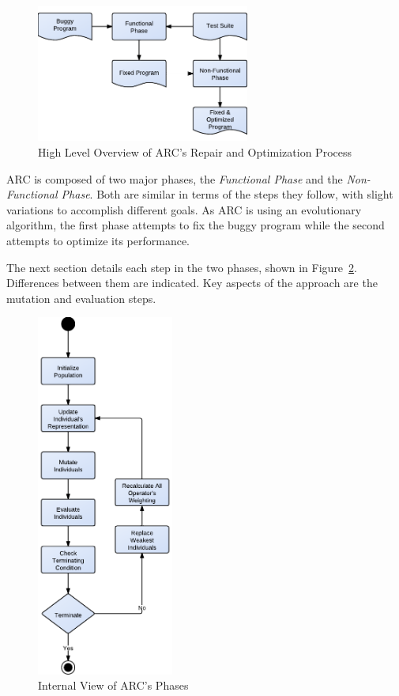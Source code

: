 \documentclass[10pt, conference, compsocconf]{IEEEtran}
\begin{document}
\begin{figure}[!h]
  \centering
  \includegraphics[width=7.0cm]{figures/process.pdf}
  \caption{High Level Overview of ARC's Repair and Optimization Process}
  \label{fig:process}
\end{figure}

ARC is composed of two major phases, the \textit{Functional Phase} and the
\textit{Non-Functional Phase}. Both are similar in terms of the steps
they follow, with slight variations to accomplish different goals.
As ARC is using an evolutionary algorithm, the first phase attempts to fix the
buggy program while the second attempts to optimize its performance. 

The next section details each step in the two phases, shown in Figure~\ref{fig:phases_internals}. Differences between them are indicated.  Key aspects of the approach are 
the mutation and evaluation steps.

\begin{figure}[!h]
  \centering
  \includegraphics[width=4.50cm]{figures/phases.pdf}
  \caption{Internal View of ARC's Phases}
  \label{fig:phases_internals}
\end{figure}
\end{document}
